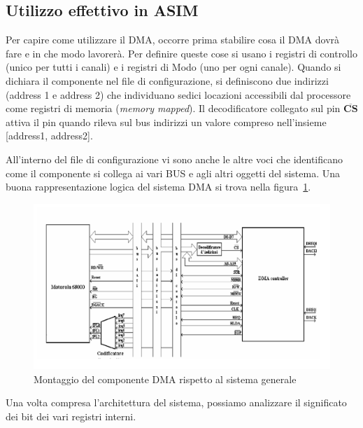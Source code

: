 \subsection{Utilizzo effettivo in ASIM}

Per capire come utilizzare il DMA, occorre prima stabilire cosa il DMA dovrà fare e in che modo lavorerà. Per definire queste cose si usano i registri di controllo (unico per tutti i canali) e i registri di Modo (uno per ogni canale). Quando si dichiara il componente nel file di configurazione, si definiscono due indirizzi (address 1 e address 2) che individuano sedici locazioni accessibili dal processore come registri di memoria (\textit{memory mapped}). Il decodificatore collegato sul pin $\overline{\mathbf{CS}}$ attiva il pin quando rileva sul bus indirizzi un valore compreso nell'insieme [address1, address2].

All'interno del file di configurazione vi sono anche le altre voci che identificano come il componente si collega ai vari BUS e agli altri oggetti del sistema. Una buona rappresentazione logica del sistema DMA si trova nella figura~\ref{img:architettura-dma}.

\begin{figure}[ht]
    \centering
    \includegraphics[width=.7\textwidth]{img/architettura-dma.png}
    \caption{Montaggio del componente DMA rispetto al sistema generale}
    \label{img:architettura-dma}
\end{figure}

Una volta compresa l'architettura del sistema, possiamo analizzare il significato dei bit dei vari registri interni.

